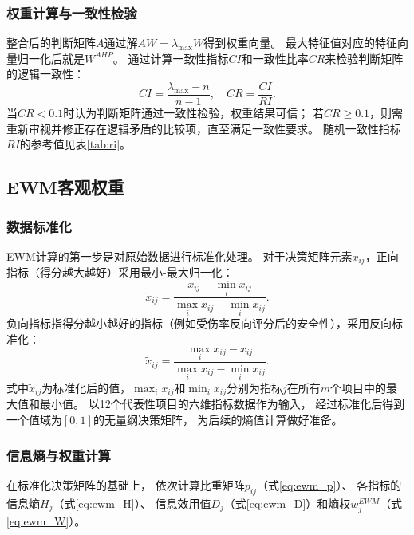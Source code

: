 \documentclass[twoside]{CUGThesis}
\begin{document}
\subsubsection{权重计算与一致性检验}

整合后的判断矩阵$A$通过解$AW = \lambda_{\max} W$得到权重向量。
最大特征值对应的特征向量归一化后就是$W^{AHP}$。
通过计算一致性指标$CI$和一致性比率$CR$来检验判断矩阵的逻辑一致性：
\begin{equation}
CI = \frac{\lambda_{\max} - n}{n - 1}, \quad
CR = \frac{CI}{RI}.
\label{eq:cr}
\end{equation}
当$CR < 0.1$时认为判断矩阵通过一致性检验，权重结果可信；
若$CR \ge 0.1$，则需重新审视并修正存在逻辑矛盾的比较项，直至满足一致性要求。
随机一致性指标$RI$的参考值见表\ref{tab:ri}。

\subsection{EWM客观权重}

\subsubsection{数据标准化}

EWM计算的第一步是对原始数据进行标准化处理。
对于决策矩阵元素$x_{ij}$，正向指标（得分越大越好）采用最小-最大归一化：
\begin{equation}
\tilde{x}_{ij} = \frac{x_{ij} - \min_i x_{ij}}{\max_i x_{ij} - \min_i x_{ij}} .
\label{eq:normalize}
\end{equation}
负向指标指得分越小越好的指标（例如受伤率反向评分后的安全性），采用反向标准化：
\begin{equation}
\tilde{x}_{ij} = \frac{\max_i x_{ij} - x_{ij}}{\max_i x_{ij} - \min_i x_{ij}} .
\label{eq:neg_normalize}
\end{equation}
式中$\tilde{x}_{ij}$为标准化后的值，$\max_i x_{ij}$和$\min_i x_{ij}$分别为指标$j$在所有$m$个项目中的最大值和最小值。
以12个代表性项目的六维指标数据作为输入，
经过标准化后得到一个值域为$[0,1]$的无量纲决策矩阵，
为后续的熵值计算做好准备。

\subsubsection{信息熵与权重计算}

在标准化决策矩阵的基础上，
依次计算比重矩阵$p_{ij}$（式\eqref{eq:ewm_p}）、
各指标的信息熵$H_j$（式\eqref{eq:ewm_H}）、
信息效用值$D_j$（式\eqref{eq:ewm_D}）和熵权$w_j^{EWM}$（式\eqref{eq:ewm_W}）。
\end{document}
